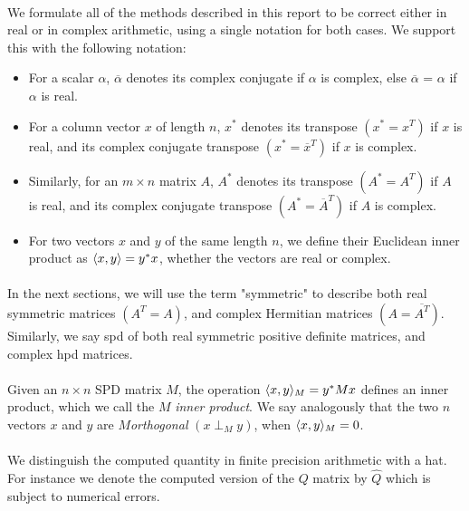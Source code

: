 \paragraph*{}
We formulate all of the methods described in this report to be correct either in
real or in complex arithmetic, using a single notation for both cases. We support this with
the following notation:

\begin{itemize}
    \item For a scalar $\alpha$, $\overline\alpha$ denotes its complex conjugate if $\alpha$ is complex, else $\overline\alpha$ = $\alpha$ if $\alpha$ is real.
    \item For a column vector $x$ of length $n$, $x^*$ denotes its transpose $(x^*=x^T)$ if $x$ is real, and its complex conjugate transpose $(x^*=\overline{x}^T)$ if $x$ is complex.
    \item Similarly, for an $m\times n$ matrix $A$, $A^*$ denotes its transpose $(A^*=A^T)$ if $A$ is real, and its complex conjugate transpose $(A^*=\overline{A}^T)$ if $A$ is complex.
    \item For two vectors $x$ and $y$ of the same length $n$, we define their Euclidean inner product as $\langle x, y \rangle=y^*x$, whether the vectors are real or complex. 
\end{itemize}

\paragraph*{}
In the next sections, we will use the term "symmetric" to describe both real symmetric matrices $(A^T=A)$,
and complex Hermitian matrices $(A=\overline{A^T})$. Similarly, we say \acrfull{spd} of both real symmetric positive definite matrices, and complex \acrfull{hpd} matrices. 

\paragraph*{}
Given an $n\times n$ SPD matrix $M$, the operation $\langle x, y \rangle_M=y^*Mx$ defines an inner product, which we call the $M$ \textit{inner product}. We say analogously that the two $n$ vectors $x$ and $y$ are $M$\textit{orthogonal} $(x \perp_M y)$, when $\langle x, y \rangle_M = 0$.

\paragraph*{}
We distinguish the computed quantity in finite precision arithmetic with a hat. For instance we denote the computed version of the $Q$ matrix by $\hat{Q}$ which is subject to numerical errors.

